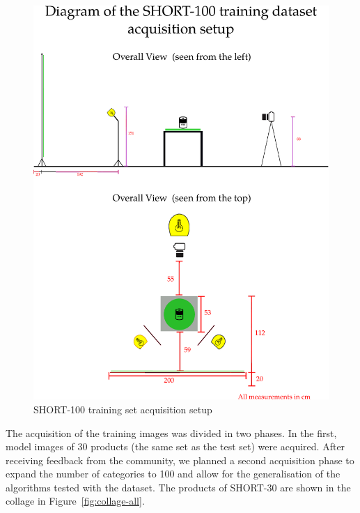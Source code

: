 \begin{figure}
\centering
\includegraphics[width=\linewidth]{gfx/Chapter03/acquisition_diagram.pdf}
\caption{SHORT-100 training set acquisition setup}
\label{fig:acqsetup}
\end{figure}

The acquisition of the training images was divided in two phases. In the first, model images of 30 products (the same set as the test set) were acquired. After receiving feedback from the community, we planned a second acquisition phase to expand the number of categories to 100 and allow for the generalisation of the algorithms tested with the dataset. The products of SHORT-30 are shown in the collage in Figure~\ref{fig:collage-all}.

